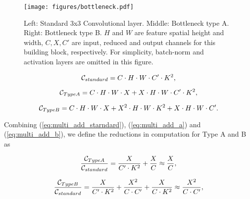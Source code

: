 \documentclass[journal]{IEEEtran}
\begin{document}
\begin{figure}[h]
\begin{center}
\texttt{[image: figures/bottleneck.pdf]}
\end{center}
\caption{Left: Standard 3x3 Convolutional layer. Middle: Bottleneck type A. Right: Bottleneck type B. $H$ and $W$ are feature spatial height and width, $C, X, C'$ are input, reduced and output channels for this building block, respectively. For simplicity, batch-norm and activation layers are omitted in this figure.}
\label{fig:bottleneck}
\end{figure}

\begin{equation}
\label{eq:multi_add_starndard}
    {\cal C}_{standard} = C \cdot H \cdot W \cdot C' \cdot K^2,
\end{equation}

\begin{equation}
\label{eq:multi_add_a}
    {\cal C}_{TypeA} = C \cdot H \cdot W \cdot X + X \cdot H \cdot W \cdot C' \cdot K^2,
\end{equation}

\begin{equation}
\label{eq:multi_add_b}
    {\cal C}_{TypeB} = C \cdot H \cdot W \cdot X + X^2 \cdot H \cdot W \cdot K^2 + X \cdot H \cdot W \cdot C'.
\end{equation}

Combining (\ref{eq:multi_add_starndard}), (\ref{eq:multi_add_a}) and (\ref{eq:multi_add_b}),
we define the reductions in computation for Type A and B as

\begin{equation}
\label{eq:multi_add_reduction_a}
    \frac{{\cal C}_{TypeA}}{{\cal C}_{standard}} = \frac{X}{C' \cdot K^2} + \frac{X}{C} \approx \frac{X}{C},
\end{equation}

\begin{equation}
\label{eq:multi_add_reduction_b}
    \frac{{\cal C}_{TypeB}}{{\cal C}_{standard}} = \frac{X}{C' \cdot K^2} + \frac{X^2}{C\cdot C'} + \frac{X}{C \cdot K^2} \approx \frac{X^2}{C \cdot C'},
\end{equation}
\end{document}
